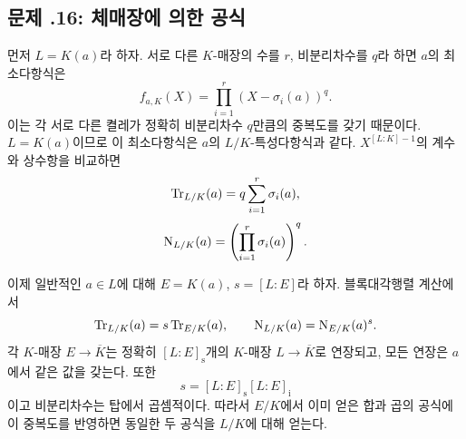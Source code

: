 \subsection*{문제 \thechapter.16: 체매장에 의한 공식}

\begin{solution}
먼저 $L=K(a)$라 하자. 서로 다른 $K$-매장의 수를 $r$,
비분리차수를 $q$라 하면 $a$의 최소다항식은
\[
  f_{a,K}(X)
  =\prod_{i=1}^r(X-\sigma_i(a))^q.
\]
이는 각 서로 다른 켤레가 정확히 비분리차수 $q$만큼의 중복도를
갖기 때문이다. $L=K(a)$이므로 이 최소다항식은 $a$의
$L/K$-특성다항식과 같다. $X^{[L:K]-1}$의 계수와 상수항을 비교하면
\[
  \operatorname{Tr}_{L/K}(a)
  =q\sum_{i=1}^r\sigma_i(a),
\]
\[
  \operatorname{N}_{L/K}(a)
  =\left(\prod_{i=1}^r\sigma_i(a)\right)^q.
\]

이제 일반적인 $a\in L$에 대해 $E=K(a)$, $s=[L:E]$라 하자.
블록대각행렬 계산에서
\[
  \operatorname{Tr}_{L/K}(a)=s\operatorname{Tr}_{E/K}(a),
  \qquad
  \operatorname{N}_{L/K}(a)=\operatorname{N}_{E/K}(a)^s.
\]
각 $K$-매장 $E\to\overline K$는 정확히 $[L:E]_{\mathrm s}$개의
$K$-매장 $L\to\overline K$로 연장되고, 모든 연장은 $a$에서 같은 값을 갖는다.
또한
\[
  s=[L:E]_{\mathrm s}[L:E]_{\mathrm i}
\]
이고 비분리차수는 탑에서 곱셈적이다. 따라서 $E/K$에서 이미 얻은
합과 곱의 공식에 이 중복도를 반영하면 동일한 두 공식을 $L/K$에 대해 얻는다.
\end{solution}
